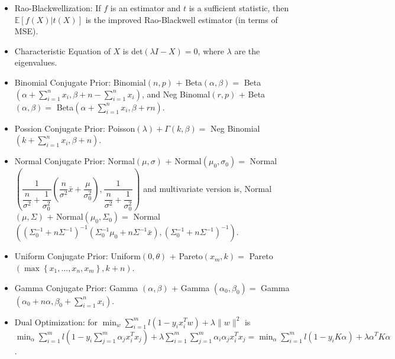 \documentclass{article}
\begin{document}
\begin{itemize}
\item Rao-Blackwellization: If $f $ is an estimator and $t $ is a sufficient statistic, then $\mathbb{E}\left[f\left(X\right) | t\left(X\right)\right]$ is the improved Rao-Blackwell estimator (in terms of MSE).
\item Characteristic Equation of $X $ is det$\left(\lambda I - X\right) = 0$, where $\lambda$ are the eigenvalues.
\item Binomial Conjugate Prior: Binomial$\left(n , p \right)$ + Beta$\left(\alpha, \beta\right) =$ Beta$\left(\alpha + \displaystyle\sum_{i=1}^{n} x_{i}, \beta + n - \displaystyle\sum_{i=1}^{n} x_{i}\right)$, and Neg Binomal$\left(r , p \right)$ + Beta$\left(\alpha, \beta\right) =$ Beta$\left(\alpha + \displaystyle\sum_{i=1}^{n} x_{i}, \beta + r n \right)$.
\item Possion Conjugate Prior: Poisson$\left(\lambda\right) + \Gamma\left(k, \beta\right) =$ Neg Binomial$\left(k  + \displaystyle\sum_{i=1}^{n} x_{i}, \beta + n \right)$.
\item Normal Conjugate Prior: Normal$\left(\mu, \sigma\right)$ + Normal$\left(\mu_{0}, \sigma_{0}\right) =$ Normal$\left(\dfrac{1}{\dfrac{n}{\sigma^{2}} + \dfrac{1}{\sigma_{0}^{2}}} \left(\dfrac{n}{\sigma^{2}} \bar{x} + \dfrac{\mu}{\sigma_{0}^{2}}\right), \dfrac{1}{\dfrac{n}{\sigma^{2}} + \dfrac{1}{\sigma_{0}^{2}}}\right)$ and multivariate version is, Normal$\left(\mu, \Sigma\right)$ + Normal$\left(\mu_{0}, \Sigma_{0}\right) =$ Normal$\left(\left(\Sigma_{0}^{-1} + n \Sigma^{-1}\right)^{-1} \left(\Sigma_{0}^{-1} \mu_{0} + n \Sigma^{-1} \bar{x}\right), \left(\Sigma_{0}^{-1} + n \Sigma^{-1}\right)^{-1}\right)$.
\item Uniform Conjugate Prior: Uniform$\left(0, \theta\right)$ + Pareto$\left(x_{m}, k \right) =$ Pareto$\left(\displaystyle\max\left\{x_{1}, ..., x_{n}, x_{m}\right\}, k + n \right)$.
\item Gamma Conjugate Prior: Gamma $\left(\alpha, \beta\right)$ + Gamma $\left(\alpha_{0}, \beta_{0}\right) =$ Gamma $\left(\alpha_{0} + n \alpha, \beta_{0} + \displaystyle\sum_{i=1}^{n} x_{i}\right)$.
\item Dual Optimization: for $\displaystyle\min_{w} \displaystyle\sum_{i=1}^{m} l\left(1 - y_{i} x_{i}^{T} w\right) + \lambda \| w \|^{2}$ is $\displaystyle\min_{\alpha} \displaystyle\sum_{i=1}^{m} l\left(1 - y_{i} \displaystyle\sum_{j=1}^{m} \alpha_{j} x_{i}^{T} x_{j}\right) + \lambda \displaystyle\sum_{i=1}^{m} \displaystyle\sum_{j=1}^{m} \alpha_{i} \alpha_{j} x_{i}^{T} x_{j}  = \displaystyle\min_{\alpha} \displaystyle\sum_{i=1}^{m} l\left(1 - y_{i} K \alpha\right) + \lambda \alpha^{T} K \alpha$.

\end{itemize}
\end{document}
